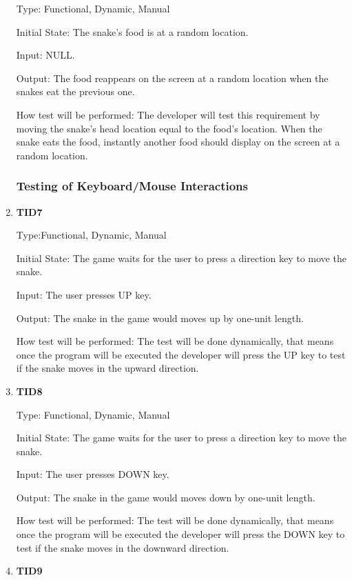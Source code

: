 \documentclass[12pt, titlepage]{article}
\begin{document}
\begin{enumerate}
Type: Functional, Dynamic, Manual 	
					
Initial State: The snake's food is at a random location.
				
Input: NULL.

Output: The food reappears on the screen at a random location when the snakes eat the previous one.
        		
How test will be performed: The developer will test this requirement by moving the snake's head location equal to the food's location. When the snake eats the food, instantly another food should display on the screen at a random location. 

\subsubsection{Testing of Keyboard/Mouse Interactions}

\item{\textbf{TID7}\\}

Type:Functional, Dynamic, Manual 	
					
Initial State: The game waits for the user to press a direction key to move the snake.
					
Input: The user presses UP key.
					
Output: The snake in the game would moves up by one-unit length.
					
How test will be performed: The test will be done dynamically, that means once the program will be executed the developer will press the UP key to test if the snake moves in the upward direction.

\item{\textbf{TID8}\\}

Type: Functional, Dynamic, Manual 	
					
Initial State: The game waits for the user to press a direction key to move the snake.
					
Input: The user presses DOWN key.
					
Output: The snake in the game would moves down by one-unit length.
					
How test will be performed: The test will be done dynamically, that means once the program will be executed the developer will press the DOWN key to test if the snake moves in the downward direction.


\item{\textbf{TID9}\\}


\end{enumerate}
\end{document}
